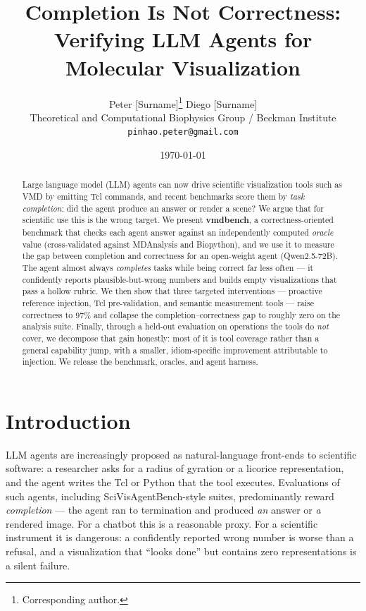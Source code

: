 \documentclass[11pt]{article}
\title{\vspace{-3em}Completion Is Not Correctness:\\
Verifying LLM Agents for Molecular Visualization}
\author{Peter [Surname]\thanks{Corresponding author.} \quad Diego [Surname] \\
\small Theoretical and Computational Biophysics Group / Beckman Institute \\
\small \texttt{pinhao.peter@gmail.com}}
\date{\today}
\begin{document}
\maketitle

\begin{abstract}
\noindent
Large language model (LLM) agents can now drive scientific visualization tools such as
VMD by emitting Tcl commands, and recent benchmarks score them by \emph{task completion}:
did the agent produce an answer or render a scene? We argue that for scientific use this is
the wrong target. We present \textbf{vmdbench}, a correctness-oriented benchmark that checks
each agent answer against an independently computed \emph{oracle} value (cross-validated
against MDAnalysis and Biopython), and we use it to measure the gap between completion and
correctness for an open-weight agent (Qwen2.5-72B). The agent almost always \emph{completes}
tasks while being correct far less often --- it confidently reports plausible-but-wrong numbers
and builds empty visualizations that pass a hollow rubric. We then show that three targeted
interventions --- proactive reference injection, Tcl pre-validation, and semantic measurement
tools --- raise correctness to 97\% and collapse the completion--correctness gap to roughly
zero on the analysis suite. Finally, through a held-out evaluation on operations the tools do
\emph{not} cover, we decompose that gain honestly: most of it is tool coverage rather than a
general capability jump, with a smaller, idiom-specific improvement attributable to injection.
We release the benchmark, oracles, and agent harness.
\end{abstract}

\section{Introduction}
LLM agents are increasingly proposed as natural-language front-ends to scientific software:
a researcher asks for a radius of gyration or a licorice representation, and the agent writes
the Tcl or Python that the tool executes. Evaluations of such agents, including
SciVisAgentBench-style suites, predominantly reward \emph{completion} --- the agent ran to
termination and produced \emph{an} answer or \emph{a} rendered image. For a chatbot this is a
reasonable proxy. For a scientific instrument it is dangerous: a confidently reported wrong
number is worse than a refusal, and a visualization that ``looks done'' but contains zero
representations is a silent failure.
\end{document}
